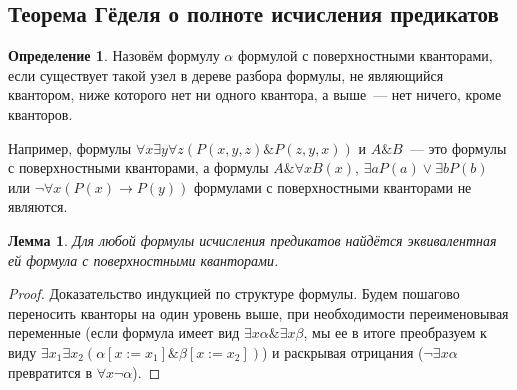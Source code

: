 \documentclass[a4paper,11pt]{article}
\newtheorem{lmm}[thm]{Лемма}
\theoremstyle{definition}
\newtheorem{dfn}[thm]{Определение}
\newcommand{\amp}{\mathbin{\&}}
\begin{document}
\subsection{Теорема Гёделя о полноте исчисления предикатов}
\begin{dfn}
Назовём формулу $\alpha$ формулой с поверхностными кванторами, если существует
такой узел в дереве разбора формулы, не являющийся квантором, ниже которого нет
ни одного квантора, а выше~--- нет ничего, кроме кванторов.
\end{dfn}

Например, формулы $\forall x\exists y\forall z(P(x, y, z) \amp P(z, y, x))$ и
$A \amp B$~--- это формулы с поверхностными кванторами, а формулы $A \amp
\forall x B(x)$, $\exists a P(a) \vee \exists b P(b)$ или $\neg\forall x(P(x)
\to P(y))$ формулами с поверхностными кванторами не являются.

\begin{lmm}
Для любой формулы исчисления предикатов найдётся эквивалентная ей формула с
поверхностными кванторами.
\end{lmm}
\begin{proof}
Доказательство индукцией по структуре формулы. Будем пошагово переносить
кванторы на один уровень выше, при необходимости переименовывая переменные
(если формула имеет вид $\exists x\alpha \amp \exists x\beta$, мы ее в итоге
преобразуем к виду $\exists x_1\exists x_2(\alpha[x := x_1] \amp \beta[x :=
x_2])$) и раскрывая отрицания ($\neg\exists x\alpha$ превратится в $\forall
x\neg\alpha$).
\end{proof}
\end{document}
